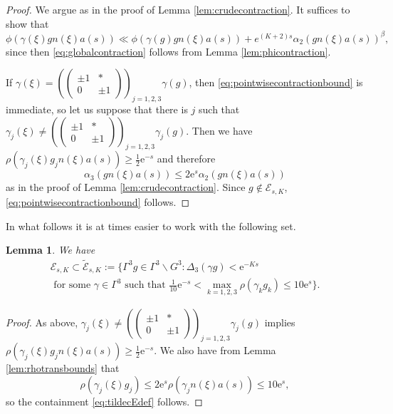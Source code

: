 \documentclass[12pt]{amsart}
\newtheorem{lem}[thm]{Lemma}
\theoremstyle{definition}
\theoremstyle{remark}
\numberwithin{equation}{section}
\newcommand{\e}{\mathrm{e}}
\newcommand{\cE}{\mathcal{E}}
\begin{document}
\begin{proof}
  We argue as in the proof of Lemma \ref{lem:crudecontraction}.
  It suffices to show that
  \begin{equation}
    \label{eq:pointwisecontractionbound}
    \phi(\gamma(\xi)gn(\xi)a(s)) \ll \phi(\gamma(g)gn(\xi)a(s)) +e^{(K+2)s} \alpha_{2}(gn(\xi)a(s))^{\beta},
  \end{equation}
  since then \eqref{eq:globalcontraction} follows from Lemma \ref{lem:phicontraction}.

  If $\gamma(\xi) = \left(\begin{pmatrix}    \pm 1 & * \\
    0 & \pm 1
  \end{pmatrix}
  \right)_{\!\! j=1,2,3} \gamma(g)$, then \eqref{eq:pointwisecontractionbound} is immediate, so let us suppose that there is $j$ such that $\gamma_j(\xi) \neq \left(\begin{pmatrix}    \pm 1 & * \\
    0 & \pm 1
  \end{pmatrix}
  \right)_{\!\! j=1,2,3} \gamma_j(g)$.
  Then we have $\rho(\gamma_j(\xi)g_jn(\xi)a(s)) \geq \tfrac{1}{2} \e^{-s}$ and therefore
  \begin{equation}
    \label{eq:gammachangebound1}
    \alpha_3(gn(\xi) a(s)) \leq 2\e^s \alpha_{2}(gn(\xi)a(s))
  \end{equation}
  as in the proof of Lemma \ref{lem:crudecontraction}.
  Since $g \not\in \cE_{s,K}$, \eqref{eq:pointwisecontractionbound} follows.
\end{proof}

In what follows it is at times easier to work with the following set.
  \begin{lem}
    \label{lem:altexceptionalset}
    We have
    \begin{multline}
      \label{eq:tildecEdef}
      \cE_{s,K} \subset \tilde{\cE}_{s,K} := \{\Gamma^3 g\in \Gamma^3 \backslash G^3: \Delta_3(\gamma g)<\e^{-Ks} \\
  \textrm{ for some } 
  \gamma \in \Gamma^3
  \textrm{ such that } \tfrac{1}{10}\e^{-s} < \max_{k=1,2,3}\rho(\gamma_kg_k) \leq 10 \e^{s} \}.
    \end{multline}
  \end{lem}
  
\begin{proof}
  As above,
  $\gamma_j(\xi) \neq \left(\begin{pmatrix}    \pm 1 & * \\
    0 & \pm 1
  \end{pmatrix}
  \right)_{\!\! j=1,2,3} \gamma_j(g)$ implies $\rho(\gamma_j(\xi)g_jn(\xi)a(s)) \geq \tfrac{1}{2} \e^{-s}$.
  We also have from Lemma \ref{lem:rhotransbounds} that
  \begin{equation}
    \label{eq:rhoupperbound}
    \rho(\gamma_j(\xi)g_j) \leq 2\e^s \rho(\gamma_jn(\xi)a(s)) \leq 10 \e^s,
  \end{equation}
  so the containment \eqref{eq:tildecEdef} follows.
\end{proof}
\end{document}

